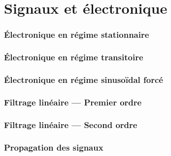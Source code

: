 \setcounter{part}{27}  %

\part{Signaux et électronique}
\section{\'Electronique en régime stationnaire}




\section{\'Electronique en régime transitoire}








%
%


\section{\'Electronique en régime sinusoïdal forcé}






\section{Filtrage linéaire --- Premier ordre}




\section{Filtrage linéaire --- Second ordre}










\section{Propagation des signaux}

